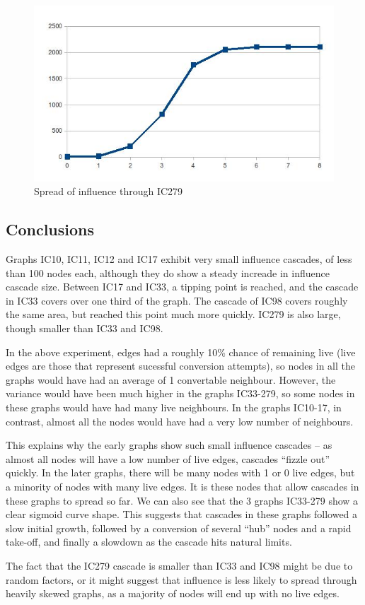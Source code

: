 \begin{figure}[htbp]%
\centering
\includegraphics[width=0.5\columnwidth]{./img/ic279}%
\caption{Spread of influence through IC279}%
\label{fig:ic279}%
\end{figure}

\subsection{Conclusions}

Graphs IC10, IC11, IC12 and IC17 exhibit very small influence cascades, of less than 100 nodes each, although they do show a steady increade in influence cascade size. Between IC17 and IC33, a tipping point is reached, and the cascade in IC33 covers over one third of the graph. The cascade of IC98 covers roughly the same area, but reached this point much more quickly. IC279 is also large, though smaller than IC33 and IC98.

In the above experiment, edges had a roughly 10\% chance of remaining live (live edges are those that represent sucessful conversion attempts), so nodes in all the graphs would have had an average of 1 convertable neighbour. However, the variance would have been much higher in the graphs IC33-279, so some nodes in these graphs would have had many live neighbours. In the graphs IC10-17, in contrast, almost all the nodes would have had a very low number of neighbours.

This explains why the early graphs show such small influence cascades -- as almost all nodes will have a low number of live edges, cascades ``fizzle out'' quickly. In the later graphs, there will be many nodes with 1 or 0 live edges, but a minority of nodes with many live edges. It is these nodes that allow cascades in these graphs to spread so far. We can also see that the 3 graphs IC33-279 show a clear sigmoid curve shape. This suggests that cascades in these graphs followed a slow initial growth, followed by a conversion of several ``hub'' nodes and a rapid take-off, and finally a slowdown as the cascade hits natural limits.

The fact that the IC279 cascade is smaller than IC33 and IC98 might be due to random factors, or it might suggest that influence is less likely to spread through heavily skewed graphs, as a majority of nodes will end up with no live edges.

